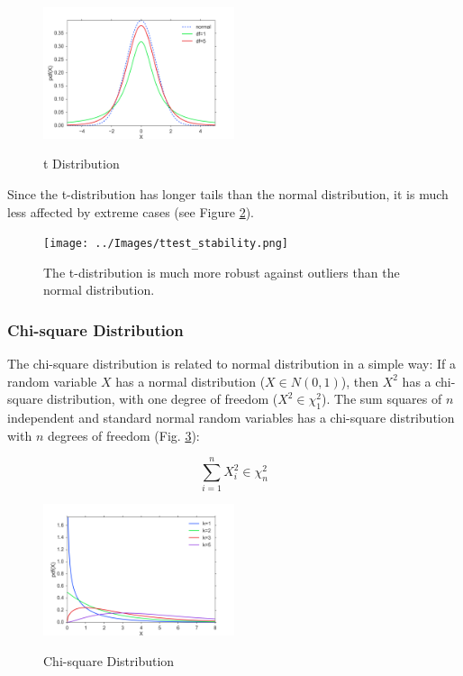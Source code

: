 \begin{figure}
  \centering
  \includegraphics[width=0.5\textwidth]{../Images/dist_t.png}\\
  \caption{t Distribution}\label{fig:t}
\end{figure}

Since the t-distribution has longer tails than the normal distribution, it is much less affected by extreme cases (see Figure \ref{fig:ttest_stability}).

\begin{figure}
  \centering
  \texttt{[image: ../Images/ttest\_stability.png]}\\
  \caption{The t-distribution is much more robust against outliers than the normal distribution.}\label{fig:ttest_stability}
\end{figure}


\subsubsection{Chi-square Distribution}

The chi-square distribution is related to normal distribution in a simple way: If a random variable $X$ has a normal distribution ($X \in N(0,1)$), then $X^2$ has a chi-square distribution, with one degree of freedom ($X^2 \in \chi_{1}^2$). The sum squares of $n$ independent and standard normal random variables has a chi-square distribution with $n$ degrees of freedom (Fig. \ref{fig:chi2}):

\begin{equation}
    \sum\limits_{i = 1}^n {X_i^2} \in \chi_{n}^2
\end{equation}


\begin{figure}
  \centering
  \includegraphics[width=0.5\textwidth]{../Images/dist_chi2.png}\\
  \caption{Chi-square Distribution}
  \label{fig:chi2}
\end{figure}

